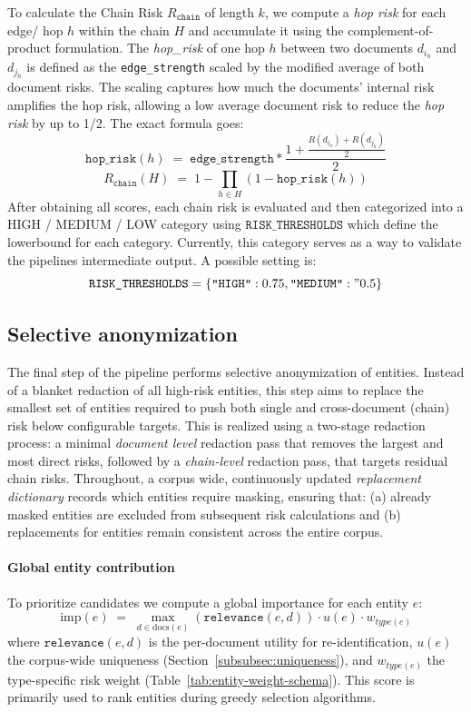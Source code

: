 To calculate the Chain Risk $R_{\texttt{chain}}$ of length $k$, we compute a \emph{hop risk} for each edge/ hop $h$ within the chain $H$ and accumulate it using the complement-of-product formulation. The \textit{hop\_risk} of one hop $h$ between two documents $d_{i_h}$ and $d_{j_h}$ is defined as the \texttt{edge\_strength} scaled by the modified average of both document risks. The scaling captures how much the documents' internal risk amplifies the hop risk, allowing a low average document risk to reduce the \emph{hop risk} by up to 1/2. The exact formula goes:
\[
\texttt{hop\_risk}(h)\;=\; \texttt{edge\_strength} * \frac{1+\frac{R(d_{i_h}) + R(d_{j_h})}{2}}{2}
\]
\[
R_{\texttt{chain}}(H) \;=\; 1 - \prod_{h\in H} (1 - \texttt{hop\_risk}(h))
\]
After obtaining all scores, each chain risk is evaluated and then categorized into a HIGH / MEDIUM / LOW category using $\texttt{RISK\_THRESHOLDS}$ which define the lowerbound for each category. Currently, this category serves as a way to validate the pipelines intermediate output. A possible setting is:
\[
\texttt{RISK\_THRESHOLDS} = \{\texttt{"HIGH"}: 0.75, \texttt{"MEDIUM"}:" 0.5\}
\]

\subsection{Selective anonymization}
The final step of the pipeline performs selective anonymization of entities. Instead of a blanket redaction of all high-risk entities, this step aims to replace the smallest set of entities required to push both single and cross-document (chain) risk below configurable targets. This is realized using a two-stage redaction process: a minimal \textit{document level} redaction pass that removes the largest and most direct risks, followed by a \textit{chain-level} redaction pass, that targets residual chain risks. Throughout, a corpus wide, continuously updated \textit{replacement dictionary} records which entities require masking, ensuring that: (a) already masked entities are excluded from subsequent risk calculations and (b) replacements for entities remain consistent across the entire corpus.


\paragraph{Global entity contribution} 
To prioritize candidates we compute a global importance for each entity \(e\):
\[
\mathrm{imp}(e) \;=\; \max_{d\in\mathrm{docs}(e)} (\texttt{relevance}(e,d)) \cdot u(e) \cdot w_{type(e)}
\]
where $\texttt{relevance}(e,d)$ is the per-document utility for re-identification, $u(e)$ the corpus-wide uniqueness (Section~\ref{subsubsec:uniqueness}), and $w_{type(e)}$ the type-specific risk weight (Table~\ref{tab:entity-weight-schema}). This score is primarily used to rank entities during greedy selection algorithms.


